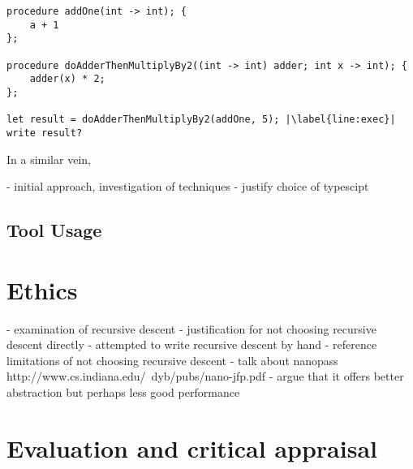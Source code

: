 \documentclass{article}
\begin{document}
\begin{lstlisting}[caption={},label={lst:untypedambiguity}, escapechar="|"]
procedure addOne(int -> int); {
	a + 1
};

procedure doAdderThenMultiplyBy2((int -> int) adder; int x -> int); {
	adder(x) * 2;
};

let result = doAdderThenMultiplyBy2(addOne, 5); |\label{line:exec}|
write result?
\end{lstlisting}

In a similar vein, 





- initial approach, investigation of techniques
- justify choice of typescipt

\subsection{Tool Usage}

\section{Ethics}
 
- examination of recursive descent 
- justification for not choosing recursive descent directly
    - attempted to write recursive descent by hand
- reference limitations of not choosing recursive descent
- talk about nanopass
 http://www.cs.indiana.edu/~dyb/pubs/nano-jfp.pdf
- argue that it offers better abstraction but perhaps less good performance

 
\section{Evaluation and critical appraisal}
\end{document}
